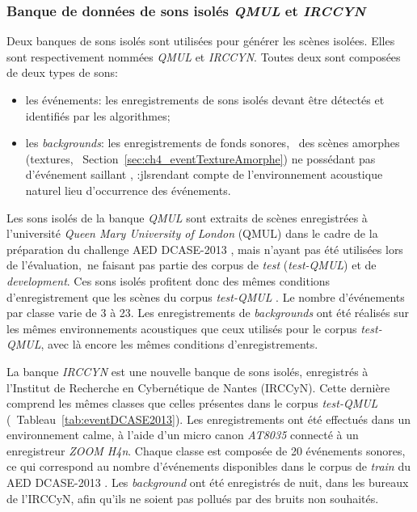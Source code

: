 \subsubsection{Banque de données de sons isolés \emph{QMUL} et \emph{IRCCYN}}
\label{sec:ch7_eventDataset}

Deux banques de sons isolés sont utilisées pour générer les scènes isolées. Elles sont respectivement nommées \emph{QMUL} et \emph{IRCCYN}. Toutes deux sont composées de deux types de sons:

\begin{itemize}
\item les événements: les enregistrements de sons isolés devant être détectés et identifiés par les algorithmes;
\item les \emph{backgrounds}: les enregistrements de fonds sonores, \ie~des scènes amorphes (textures, \cf~Section~\ref{sec:ch4_eventTextureAmorphe}) ne possédant pas d'événement saillant ,  :jls{rendant compte} de l’environnement acoustique naturel   lieu d'occurrence des événements. 
\end{itemize}

Les sons isolés de la banque \emph{QMUL} sont extraits de scènes enregistrées à l'université \emph{Queen Mary University of London} (QMUL) dans le cadre de la préparation du challenge AED DCASE-2013 , mais n'ayant pas été utilisées lors de l'évaluation,~\ie ne faisant pas partie des corpus de \emph{test} (\emph{test-QMUL}) et de \emph{development}. Ces sons isolés profitent donc des mêmes conditions d’enregistrement que les scènes du corpus \emph{test-QMUL} \citep{Giannoulis:2013a}. Le nombre d'événements par classe varie de 3 à 23. Les enregistrements de \emph{backgrounds} ont été réalisés sur les mêmes environnements acoustiques que ceux utilisés pour le corpus \emph{test-QMUL}, avec là encore les mêmes conditions d'enregistrements.

La banque \emph{IRCCYN} est une nouvelle banque de sons isolés, enregistrés à l'Institut de Recherche en Cybernétique de Nantes (IRCCyN). Cette dernière comprend les mêmes classes que celles présentes dans le corpus \emph{test-QMUL} (\cf~Tableau~\ref{tab:eventDCASE2013}). Les enregistrements ont été effectués dans un environnement calme, à l'aide d'un micro canon \emph{AT8035} connecté à un enregistreur \emph{ZOOM H4n}. Chaque classe est composée de 20 événements sonores, ce qui correspond au nombre d'événements disponibles dans le corpus de \emph{train} du AED DCASE-2013 \citep{Giannoulis:2013a}. Les \emph{background} ont été enregistrés de nuit, dans les bureaux de l'IRCCyN, afin qu'ils ne soient pas pollués par des bruits non souhaités. \\

